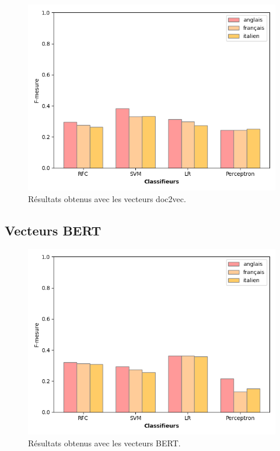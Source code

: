 \begin{figure}[t]
  \includegraphics[width=\columnwidth]{assets/comparaison_metriques_doc2vec.png}
  \caption{Résultats obtenus avec les vecteurs doc2vec.}
  \label{fig:doc2vec_comparison}
\end{figure}
\subsection{Vecteurs BERT}

\begin{figure}[t]
  \includegraphics[width=\columnwidth]{assets/comparaison_metriques_bert.png}
  \caption{Résultats obtenus avec les vecteurs BERT.}
  \label{fig:bert_comparison}
\end{figure}

